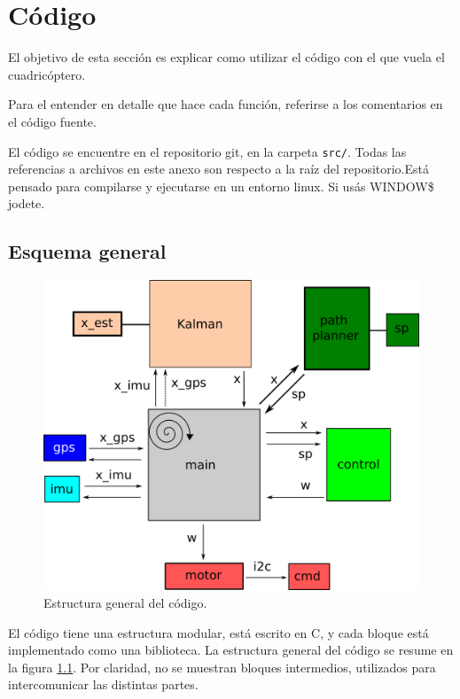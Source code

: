 \documentclass[main]{subfiles}
\begin{document}
\chapter{Código}
\label{chap:codigo}

El objetivo de esta sección es explicar como utilizar el código con el que vuela el cuadricóptero.

Para el entender en detalle que hace cada función, referirse a los comentarios en el código fuente.

El código se encuentre en el repositorio git, en la carpeta \verb+src/+. Todas las referencias a archivos en este anexo son respecto a la raíz del repositorio.Está pensado para compilarse y ejecutarse en un entorno linux. Si usás WINDOW\$ jodete. 

\section{Esquema general}
\label{sec:codigo:esquema-general}

\begin{figure}
\vspace{-20pt}
\centering
  \includegraphics{./pics_codigo/code.png}
\caption{Estructura general del código.}
\vspace{-20pt}
\label{fig:codigo:code.png}
\end{figure}

El código tiene una estructura modular, está escrito en C, y cada bloque está implementado como una biblioteca. La estructura general del código se resume en la figura \ref{fig:codigo:code.png}. Por claridad, no se muestran bloques intermedios, utilizados para intercomunicar las distintas partes.
\end{document}
